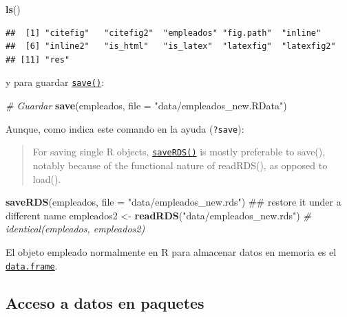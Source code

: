 \documentclass[]{book}
\newenvironment{Shaded}{\begin{snugshade}}{\end{snugshade}}
\newcommand{\KeywordTok}[1]{\textcolor[rgb]{0.13,0.29,0.53}{\textbf{#1}}}
\newcommand{\DataTypeTok}[1]{\textcolor[rgb]{0.13,0.29,0.53}{#1}}
\newcommand{\StringTok}[1]{\textcolor[rgb]{0.31,0.60,0.02}{#1}}
\newcommand{\CommentTok}[1]{\textcolor[rgb]{0.56,0.35,0.01}{\textit{#1}}}
\newcommand{\NormalTok}[1]{#1}
\begin{document}
\begin{Shaded}
\begin{Highlighting}[]
\KeywordTok{ls}\NormalTok{()}
\end{Highlighting}
\end{Shaded}

\begin{verbatim}
##  [1] "citefig"   "citefig2"  "empleados" "fig.path"  "inline"   
##  [6] "inline2"   "is_html"   "is_latex"  "latexfig"  "latexfig2"
## [11] "res"
\end{verbatim}

y para guardar
\href{https://www.rdocumentation.org/packages/base/versions/3.6.1/topics/save}{\texttt{save()}}:

\begin{Shaded}
\begin{Highlighting}[]
\CommentTok{# Guardar}
\KeywordTok{save}\NormalTok{(empleados, }\DataTypeTok{file =} \StringTok{"data/empleados_new.RData"}\NormalTok{)}
\end{Highlighting}
\end{Shaded}

Aunque, como indica este comando en la ayuda (\texttt{?save}):

\begin{quote}
For saving single R objects,
\href{https://www.rdocumentation.org/packages/base/versions/3.6.1/topics/saveRDS}{\texttt{saveRDS()}}
is mostly preferable to save(), notably because of the functional nature
of readRDS(), as opposed to load().
\end{quote}

\begin{Shaded}
\begin{Highlighting}[]
\KeywordTok{saveRDS}\NormalTok{(empleados, }\DataTypeTok{file =} \StringTok{"data/empleados_new.rds"}\NormalTok{)}
\NormalTok{## restore it under a different name}
\NormalTok{empleados2 <-}\StringTok{ }\KeywordTok{readRDS}\NormalTok{(}\StringTok{"data/empleados_new.rds"}\NormalTok{)}
\CommentTok{# identical(empleados, empleados2)}
\end{Highlighting}
\end{Shaded}

El objeto empleado normalmente en R para almacenar datos en memoria es
el
\href{https://www.rdocumentation.org/packages/base/versions/3.6.1/topics/data.frame}{\texttt{data.frame}}.

\subsection{Acceso a datos en
paquetes}\label{acceso-a-datos-en-paquetes}
\end{document}
